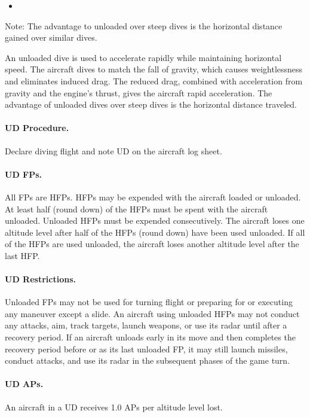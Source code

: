 {\begin{itemize}
     \item{} 

\end{itemize}

Note: The advantage to unloaded over steep dives is the horizontal distance gained over similar dives.

}{

An unloaded dive is used to accelerate rapidly while maintaining horizontal speed. The aircraft dives to match the fall of gravity, which causes weightlessness and eliminates induced drag. The reduced drag, combined with acceleration from gravity and the engine's thrust, gives the aircraft rapid acceleration. The advantage of unloaded dives over steep dives is the horizontal distance traveled.

\paragraph{UD Procedure.} Declare diving flight and note UD on the aircraft log sheet. 

\paragraph{UD FPs.} All FPs are HFPs. HFPs may be expended with the aircraft loaded or unloaded. At least half (round down) of the HFPs must be spent with the aircraft unloaded. Unloaded HFPs must be expended consecutively. The aircraft loses one altitude level after half of the HFPs (round down) have been used unloaded. If all of the HFPs are used unloaded, the aircraft loses another altitude level after the last HFP.
   
\paragraph{UD Restrictions.} Unloaded FPs may not be used for turning flight or preparing for or executing any maneuver except a slide. An aircraft using unloaded HFPs may not conduct any attacks, aim, track targets, launch weapons, or use its radar until after a recovery period. If an aircraft unloads early in its move and then completes the recovery period before or as its last unloaded FP, it may still launch missiles, conduct attacks, and use its radar in the subsequent phases of the game turn.

\paragraph{UD APs.} An aircraft in a UD receives 1.0 APs per altitude level lost.

}

